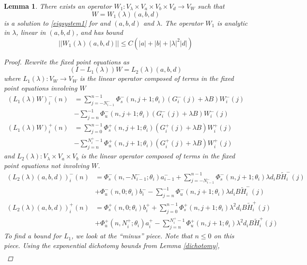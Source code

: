 \documentclass[12pt]{article}
\newtheorem{lemma}{Lemma}
\begin{document}
\begin{lemma}\label{eiginv1}
There exists an operator $W_1: V_\lambda \times V_a \times V_b \times V_d \rightarrow V_W$ such that
\[
W = W_1(\lambda)(a,b,d)
\]
is a solution to \eqref{eigsystem1} for and $(a,b,d)$ and $\lambda$. The operator $W_1$ is analytic in $\lambda$, linear in $(a,b,d)$, and has bound
\begin{equation}\label{W1bound}
||W_1(\lambda)(a,b,d)|| \leq C \left( |a| + |b| + |\lambda|^2 |d| \right)
\end{equation}

\begin{proof}
Rewrite the fixed point equations as
\[
(I - L_1(\lambda))W = L_2(\lambda)(a,b,d)
\]
where $L_1(\lambda): V_W \rightarrow V_W$ is the linear operator composed of terms in the fixed point equations involving $W$
\begin{align*}
(L_1(\lambda)W)_i^-(n) &= \sum_{j = -N_{i-1}^-}^{n-1} \Phi_s^-(n, j+1; \theta_i)
(G_i^-(j) + \lambda B) W_i^-(j) \\&- \sum_{j = n}^{-1} \Phi_u^-(n, j+1; \theta_i) 
(G_i^-(j) + \lambda B) W_i^-(j)\\
(L_1(\lambda)W)_i^+(n) &= \sum_{j = 0}^{n-1} \Phi_s^+(n, j+1; \theta_i) 
(G_i^+(j) + \lambda B) W_i^+(j) \\
&-\sum_{j = n}^{N_i^+-1} \Phi_u^+(n, j+1; \theta_i) 
(G_i^+(j) + \lambda B) W_i^+(j)
\end{align*}
and $L_2(\lambda): V_\lambda \times V_a \times V_b $ is the linear operator composed of terms in the fixed point equations not involving $W$.
\begin{align*}
(L_2(\lambda)(a,b,d))_i^-(n) &= 
\Phi_s^-(n, -N_{i-1}^-; \theta_i) a_{i-1}^- + \sum_{j = -N_{i-1}^-}^{n-1} \Phi_s^-(n, j+1; \theta_i)
\lambda d_i B \tilde{H}_i^-(j)
 \\
&+ \Phi_u^-(n, 0; \theta_i) b_i^- - \sum_{j = n}^{-1} \Phi_u^-(n, j+1; \theta_i) 
\lambda d_i B \tilde{H}_i^-(j) \\
(L_2(\lambda)(a,b,d))_i^+(n) &= \Phi_s^+(n, 0; \theta_i) b_i^+ + \sum_{j = 0}^{n-1} \Phi_s^+(n, j+1; \theta_i)\lambda^2 d_i B \tilde{H}_i^+(j) \\
&+ \Phi_u^+(n, N_i^+; \theta_i) a_i^+ - \sum_{j = n}^{N_i^+-1} \Phi_u^+(n, j+1; \theta_i)\lambda^2 d_i B \tilde{H}_i^+(j)
\end{align*}
To find a bound for $L_1$, we look at the ``minus'' piece. Note that $n \leq 0$ on this piece. Using the exponential dichotomy bounds from Lemma \ref{dichotomy},
\begin{align*}

\end{align*}
\end{proof}
\end{lemma}
\end{document}
